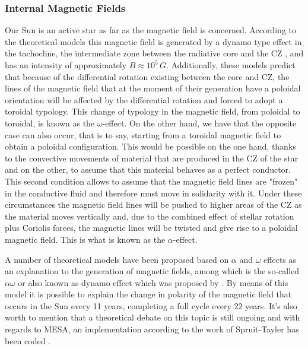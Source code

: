 \documentclass[fleqn,usenatbib]{mnras}
\begin{document}
\subsubsection{Internal Magnetic Fields}
Our Sun is an active star as far as the magnetic field is concerned. According to the theoretical models this magnetic field is generated by a dynamo type effect in the tachocline, the intermediate zone between the radiative core and the CZ \citep{Aschwanden2014}, and has an intensity of approximately $B\approx10^5\, G$. Additionally, these models predict that because of the differential rotation existing between the core and CZ, the lines of the magnetic field that at the moment of their generation have a poloidal orientation will be affected by the differential rotation and forced to adopt a toroidal typology. This change of typology in the magnetic field, from poloidal to toroidal, is known as the $\omega$-effect. On the other hand, we have that the opposite case can also occur, that is to say, starting from a toroidal magnetic field to obtain a poloidal configuration. This would be possible on the one hand, thanks to the convective movements of material that are produced in the CZ of the star and on the other, to assume that this material behaves as a perfect conductor. This second condition allows to assume that the magnetic field lines are "frozen" in the conductive fluid and therefore must move in solidarity with it. Under these circumstances the magnetic field lines will be pushed to higher areas of the CZ as the material moves vertically and, due to the combined effect of stellar rotation plus Coriolis forces, the magnetic lines will be twisted and give rise to a poloidal magnetic field. This is what is known as the $\alpha$-effect.\par

A number of theoretical models have been proposed based on $\alpha$ and $\omega$ effects as an explanation to the generation of magnetic fields, among which is the so-called $\alpha\omega$ or also known as dynamo effect which was proposed by \citet{Spruit2002}. By means of this model it is possible to explain the change in polarity of the magnetic field that occurs in the Sun every 11 years, completing a full cycle every 22 years. It's also worth to mention that a theoretical debate on this topic is still ongoing \citep{Denissenkov2007} and with regards to MESA, an implementation according to the work of Spruit-Tayler has been coded \citep{Paxton2013}.\par
\end{document}
